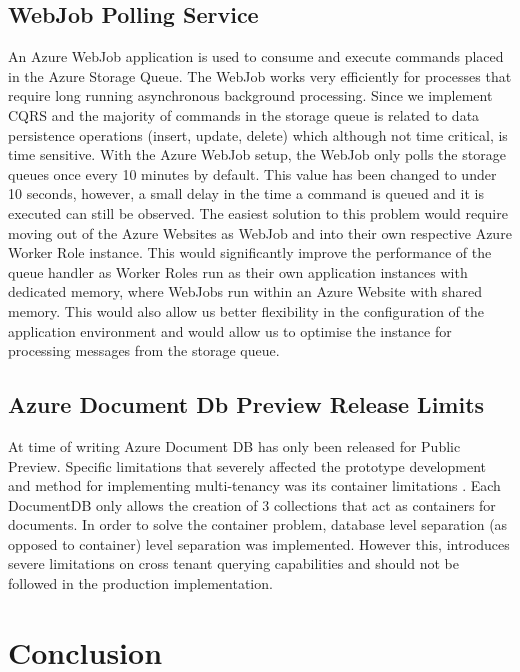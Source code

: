 \subsection{WebJob Polling Service}
An Azure WebJob application is used to consume and execute commands placed in the Azure Storage Queue. The WebJob works very efficiently for processes that require long running asynchronous background processing. Since we implement CQRS and the majority of commands in the storage queue is related to data persistence operations (insert, update, delete) which although not time critical, is time sensitive. With the Azure WebJob setup, the WebJob only polls the storage queues once every 10 minutes by default. This value has been changed to under 10 seconds, however, a small delay in the time a command is queued and it is executed can still be observed. The easiest solution to this problem would require moving out of the Azure Websites as WebJob and into their own respective Azure Worker Role instance. This would significantly improve the performance of the queue handler as Worker Roles run as their own application instances with dedicated memory, where WebJobs run within an Azure Website with shared memory. This would also allow us better flexibility in the configuration of the application environment and would allow us to optimise the instance for processing messages from the storage queue.

\subsection{Azure Document Db Preview Release Limits}
At time of writing Azure Document DB has only been released for Public Preview. Specific limitations that severely affected the prototype development and method for implementing multi-tenancy  was its container limitations \cite{AzureLimits}. Each DocumentDB only allows the creation of 3 collections that act as containers for documents. In order to solve the container problem, database level separation (as opposed to container) level separation was implemented. However this, introduces severe limitations on cross tenant querying capabilities and should not be followed in the production implementation.

\section{Conclusion}

